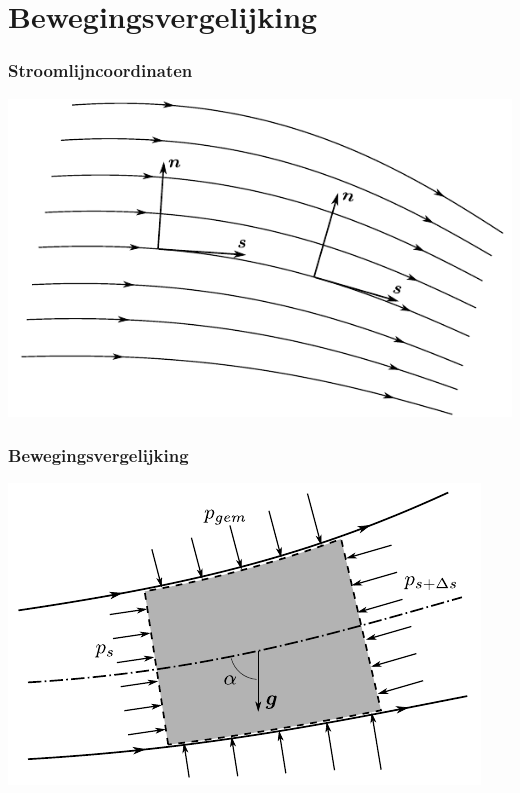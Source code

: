 \documentclass[t]{beamer}
\begin{document}
  	\section{Bewegingsvergelijking}	
  	\begin{frame}
		\frametitle{Stroomlijncoordinaten}
		\vspace{0.5cm}
		\centering
		\includegraphics{../fig/deeltjesvergelijkingen/Stoomlijncoordinaten}
  	\end{frame}
  	\begin{frame}
		\frametitle{Bewegingsvergelijking}
		\vspace{0.5cm}
		\centering
		\includegraphics{../fig/deeltjesvergelijkingen/Controlevolume_tussen_stroomlijnen}
  	\end{frame}
\end{document}
